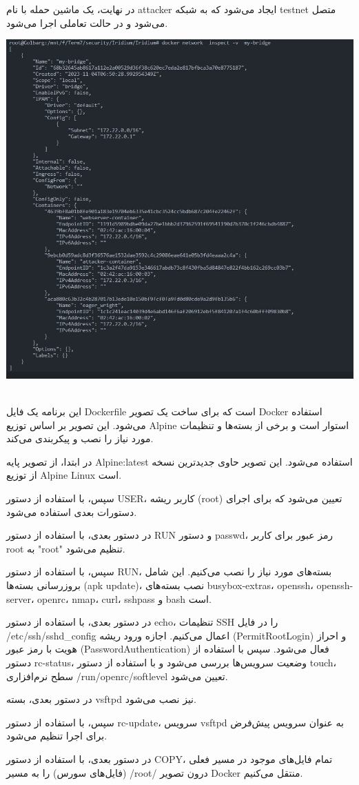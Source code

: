 \documentclass[oneside]{report}
\begin{document}
در نهایت، یک ماشین حمله با نام attacker ایجاد می‌شود که به شبکه testnet متصل می‌شود و در حالت تعاملی اجرا می‌شود.
\\
\begin{center}
    \includegraphics[height=0.5\linewidth]{1.png}
\end{center}
\\
این برنامه یک فایل Dockerfile است که برای ساخت یک تصویر Docker استفاده می‌شود. این تصویر بر اساس توزیع Alpine استوار است و برخی از بسته‌ها و تنظیمات مورد نیاز را نصب و پیکربندی می‌کند.

در ابتدا، از تصویر پایه Alpine:latest استفاده می‌شود. این تصویر حاوی جدیدترین نسخه از توزیع Alpine Linux است.

سپس، با استفاده از دستور USER، کاربر ریشه (root) تعیین می‌شود که برای اجرای دستورات بعدی استفاده می‌شود.

در دستور بعدی، با استفاده از دستور RUN و دستور passwd، رمز عبور برای کاربر root به "root" تنظیم می‌شود.

سپس، با استفاده از دستور RUN، بسته‌های مورد نیاز را نصب می‌کنیم. این شامل بروزرسانی بسته‌ها (apk update)، نصب بسته‌های busybox-extras، openssh، openssh-server، openrc، nmap، curl، sshpass و bash است.

در دستور بعدی، با استفاده از دستور echo، تنظیمات SSH را در فایل /etc/ssh/sshd_config اعمال می‌کنیم. اجازه ورود ریشه (PermitRootLogin) و احراز هویت با رمز عبور (PasswordAuthentication) فعال می‌شود. سپس با استفاده از دستور rc-status، وضعیت سرویس‌ها بررسی می‌شود و با استفاده از دستور touch، سطح نرم‌افزاری /run/openrc/softlevel تعیین می‌شود.

در دستور بعدی، بسته vsftpd نیز نصب می‌شود.

سپس، با استفاده از دستور rc-update، سرویس vsftpd به عنوان سرویس پیش‌فرض برای اجرا تنظیم می‌شود.

در دستور بعدی، با استفاده از دستور COPY، تمام فایل‌های موجود در مسیر فعلی (فایل‌های سورس) را به مسیر /root/ درون تصویر Docker منتقل می‌کنیم.
\end{document}
